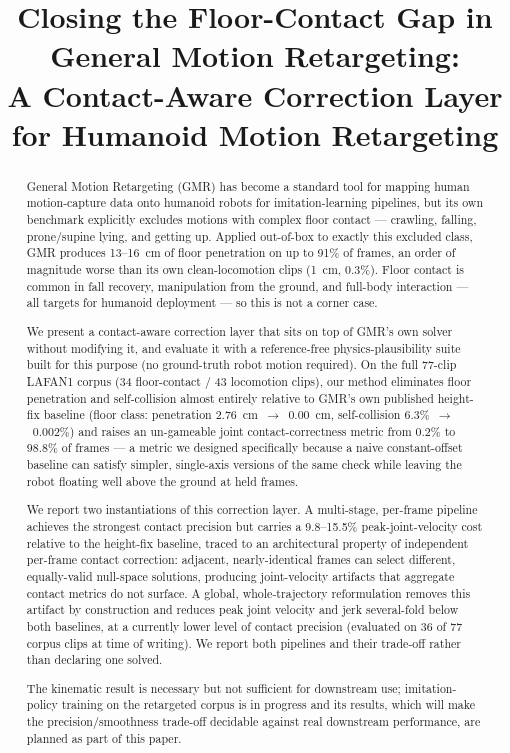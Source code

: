 \documentclass[conference]{IEEEtran}
\title{Closing the Floor-Contact Gap in General Motion Retargeting:\\
A Contact-Aware Correction Layer for Humanoid Motion Retargeting}
\author{
  \IEEEauthorblockN{Author Name(s) --- TODO}
  \IEEEauthorblockA{Affiliation --- TODO \\
  email@example.com --- TODO}
}
\begin{document}
\maketitle

\begin{abstract}
General Motion Retargeting (GMR) has become a standard tool for mapping
human motion-capture data onto humanoid robots for imitation-learning
pipelines, but its own benchmark explicitly excludes motions with complex
floor contact --- crawling, falling, prone/supine lying, and getting up.
Applied out-of-box to exactly this excluded class, GMR produces 13--16~cm
of floor penetration on up to 91\% of frames, an order of magnitude worse
than its own clean-locomotion clips (1~cm, 0.3\%). Floor contact is common
in fall recovery, manipulation from the ground, and full-body interaction
--- all targets for humanoid deployment --- so this is not a corner case.

We present a contact-aware correction layer that sits on top of GMR's own
solver without modifying it, and evaluate it with a reference-free
physics-plausibility suite built for this purpose (no ground-truth robot
motion required). On the full 77-clip LAFAN1 corpus (34 floor-contact / 43
locomotion clips), our method eliminates floor penetration and
self-collision almost entirely relative to GMR's own published height-fix
baseline (floor class: penetration 2.76~cm~$\to$~0.00~cm, self-collision
6.3\%~$\to$~0.002\%) and raises an un-gameable joint contact-correctness
metric from 0.2\% to 98.8\% of frames --- a metric we designed specifically
because a naive constant-offset baseline can satisfy simpler, single-axis
versions of the same check while leaving the robot floating well above the
ground at held frames.

We report two instantiations of this correction layer. A multi-stage,
per-frame pipeline achieves the strongest contact precision but carries a
9.8--15.5\% peak-joint-velocity cost relative to the height-fix baseline,
traced to an architectural property of independent per-frame contact
correction: adjacent, nearly-identical frames can select different,
equally-valid null-space solutions, producing joint-velocity artifacts that
aggregate contact metrics do not surface. A global, whole-trajectory
reformulation removes this artifact by construction and reduces peak joint
velocity and jerk several-fold below both baselines, at a currently lower
level of contact precision (evaluated on 36 of 77 corpus clips at time of
writing). We report both pipelines and their trade-off rather than
declaring one solved.

The kinematic result is necessary but not sufficient for downstream use;
imitation-policy training on the retargeted corpus is in progress and its
results, which will make the precision/smoothness trade-off decidable
against real downstream performance, are planned as part of this paper.
\end{abstract}
\end{document}

